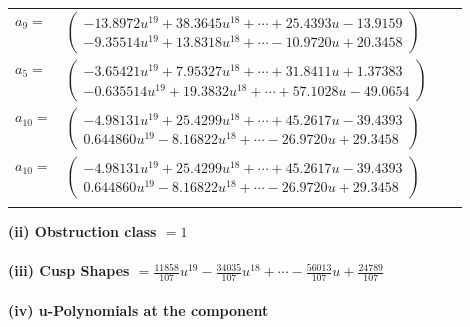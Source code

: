 \documentclass[1p]{elsarticle_modified}
\theoremstyle{definition}
\begin{document}
\begin{tabular}{m{7pt} m{180pt} m{7pt} m{180pt} }
\flushright $a_{9}=$&$\begin{pmatrix}-13.8972 u^{19}+38.3645 u^{18}+\cdots+25.4393 u-13.9159\\-9.35514 u^{19}+13.8318 u^{18}+\cdots-10.9720 u+20.3458\end{pmatrix}$ \\
\flushright $a_{5}=$&$\begin{pmatrix}-3.65421 u^{19}+7.95327 u^{18}+\cdots+31.8411 u+1.37383\\-0.635514 u^{19}+19.3832 u^{18}+\cdots+57.1028 u-49.0654\end{pmatrix}$ \\
\flushright $a_{10}=$&$\begin{pmatrix}-4.98131 u^{19}+25.4299 u^{18}+\cdots+45.2617 u-39.4393\\0.644860 u^{19}-8.16822 u^{18}+\cdots-26.9720 u+29.3458\end{pmatrix}$\\ \flushright $a_{10}=$&$\begin{pmatrix}-4.98131 u^{19}+25.4299 u^{18}+\cdots+45.2617 u-39.4393\\0.644860 u^{19}-8.16822 u^{18}+\cdots-26.9720 u+29.3458\end{pmatrix}$\\&\end{tabular}
\flushleft \textbf{(ii) Obstruction class $= 1$}\\~\\
\flushleft \textbf{(iii) Cusp Shapes $= \frac{11858}{107} u^{19}-\frac{34035}{107} u^{18}+\cdots-\frac{56013}{107} u+\frac{24789}{107}$}\\~\\
\newpage\renewcommand{\arraystretch}{1}
\flushleft \textbf{(iv) u-Polynomials at the component}\newline \\
\end{document}
